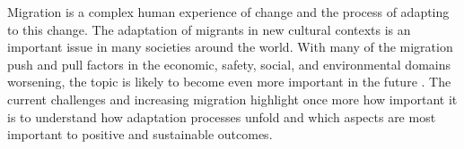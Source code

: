 \documentclass[man, 12pt, a4paper]{apa7}
\begin{document}
%
%
%

Migration is a complex human experience of change and the process of adapting to this change. The adaptation of migrants in new cultural contexts is an important issue in many societies around the world. With many of the migration push and pull factors in the economic, safety, social, and environmental domains worsening, the topic is likely to become even more important in the future \citep[e.g.,][]{InternationalOrganizationforMigration2020}.
The current challenges and increasing migration highlight once more how important it is to understand how adaptation processes unfold and which aspects are most important to positive and sustainable outcomes. 
\end{document}
